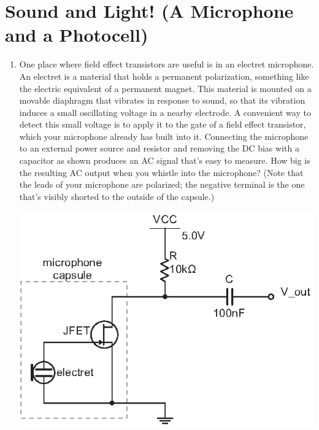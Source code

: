 \section{Sound and Light! (A Microphone and a Photocell)}
\label{lab_microphone_photocell}


\bigskip

\begin{enumerate}[wide]

\item One place where field effect transistors are useful is in an electret microphone.  An electret is a material that holds a permanent polarization, something like the electric equivalent of a permanent magnet.  This material is mounted on a movable diaphragm that vibrates in response to sound, so that its vibration induces a small oscillating voltage in a nearby electrode.  A convenient way to detect this small voltage is to apply it to the gate of a field effect transistor, which your microphone already has built into it.  Connecting the microphone to an external power source and resistor and removing the DC bias with a capacitor as shown produces an AC signal that's easy to measure.  How big is the resulting AC output when you whistle into the microphone?   (Note that the leads of your microphone are polarized; the negative terminal is the one that's visibly shorted to the outside of the capsule.)  \label{part_microphone}
\begin{center}
\includegraphics{microphone_photocell/microphone_circuit.eps}
\end{center}


\end{enumerate}
